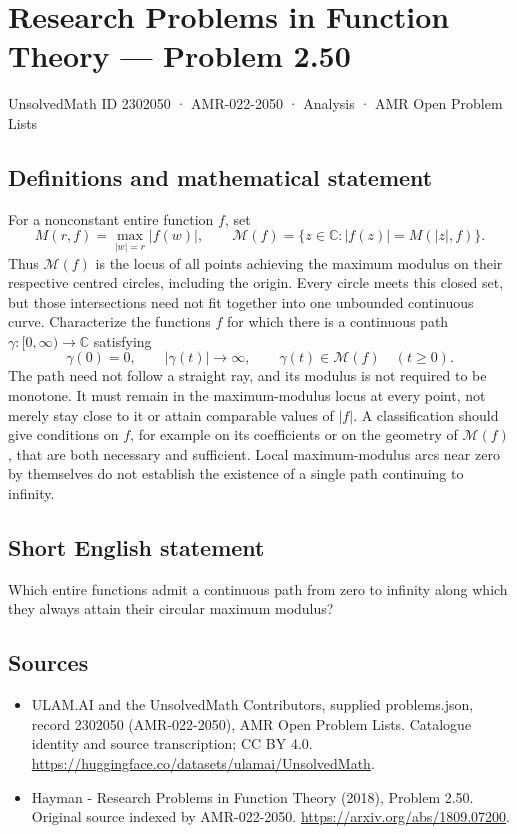 \documentclass[11pt,a4paper]{article}
\begin{document}
\section*{Research Problems in Function Theory — Problem 2.50}\label{2302050}
{\small UnsolvedMath ID 2302050 · AMR-022-2050 · Analysis · AMR Open Problem Lists}
\subsection{Definitions and mathematical statement}
For a nonconstant entire function $f$, set
\[
M(r,f)=\max_{|w|=r}|f(w)|,
\qquad \mathcal M(f)=\{z\in\mathbb C:|f(z)|=M(|z|,f)\}.
\]
Thus $\mathcal M(f)$ is the locus of all points achieving the maximum modulus on their respective centred circles, including the origin. Every circle meets this closed set, but those intersections need not fit together into one unbounded continuous curve.
Characterize the functions $f$ for which there is a continuous path
$\gamma:[0,\infty)\to\mathbb C$ satisfying
\[
\gamma(0)=0,\qquad |\gamma(t)|\longrightarrow\infty,
\qquad\gamma(t)\in\mathcal M(f)\quad(t\ge0).
\]
The path need not follow a straight ray, and its modulus is not required to be monotone. It must remain in the maximum-modulus locus at every point, not merely stay close to it or attain comparable values of $|f|$. A classification should give conditions on $f$, for example on its coefficients or on the geometry of $\mathcal M(f)$, that are both necessary and sufficient. Local maximum-modulus arcs near zero by themselves do not establish the existence of a single path continuing to infinity.
\subsection{Short English statement}
Which entire functions admit a continuous path from zero to infinity along which they always attain their circular maximum modulus?
\subsection{Sources}
\begin{itemize}
\item[S1] ULAM.AI and the UnsolvedMath Contributors, supplied problems.json, record 2302050 (AMR-022-2050), AMR Open Problem Lists. Catalogue identity and source transcription; CC BY 4.0.
\url{https://huggingface.co/datasets/ulamai/UnsolvedMath}.
\item[S2] Hayman - Research Problems in Function Theory (2018), Problem 2.50. Original source indexed by AMR-022-2050.
\url{https://arxiv.org/abs/1809.07200}.
\end{itemize}
\end{document}
